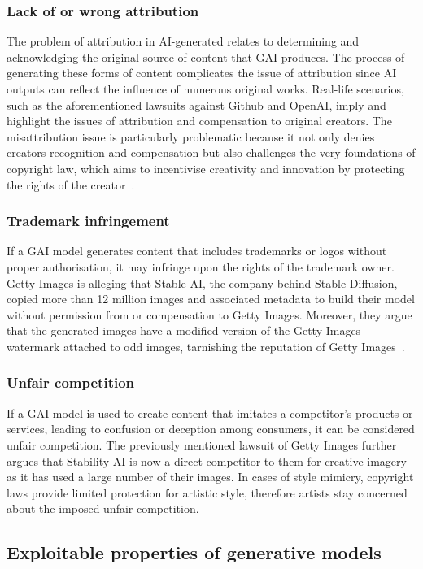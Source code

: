 \documentclass[conference,table]{IEEEtran}
\begin{document}
\subsubsection{Lack of or wrong attribution} 
The problem of attribution in AI-generated relates to determining and acknowledging the original source of content that GAI produces. The process of generating these forms of content complicates the issue of attribution since AI outputs can reflect the influence of numerous original works. 
Real-life scenarios, such as the aforementioned lawsuits against Github and OpenAI, imply and highlight the issues of attribution and compensation to original creators. 
The misattribution issue is particularly problematic because it not only denies creators recognition and compensation but also challenges the very foundations of copyright law, which aims to incentivise creativity and innovation by protecting the rights of the creator~\cite{ulku_kahveci_attribution_2023}.

\subsubsection{Trademark infringement} 
If a GAI model generates content that includes trademarks or logos without proper authorisation, it may infringe upon the rights of the trademark owner. 
Getty Images is alleging that Stable AI, the company behind Stable Diffusion, copied more than 12 million images and associated metadata to build their model without permission from or compensation to Getty Images. 
Moreover, they argue that the generated images have a modified version of the Getty Images watermark attached to odd images, tarnishing the reputation of Getty Images~\cite{vincent_getty_2023}.
    
\subsubsection{Unfair competition} 
If a GAI model is used to create content that imitates a competitor's products or services, leading to confusion or deception among consumers, it can be considered unfair competition. The previously mentioned lawsuit of Getty Images further argues that Stability AI is now a direct competitor to them for creative imagery as it has used a large number of their images. In cases of style mimicry, copyright laws provide limited protection for artistic style, therefore artists stay concerned about the imposed unfair competition.  


\subsection{Exploitable properties of generative models}
\end{document}
